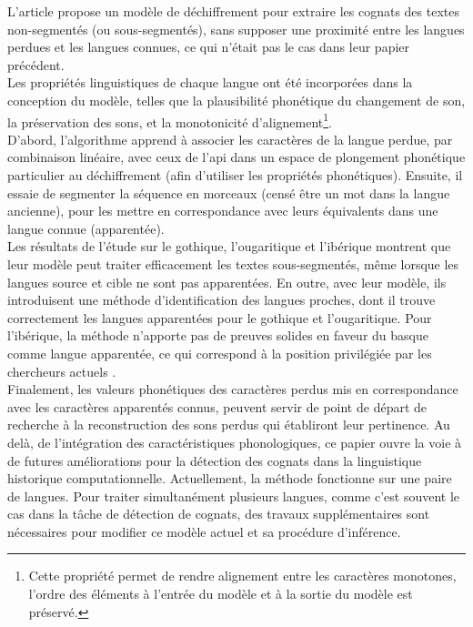 \documentclass[12pt, twoside]{report}
\begin{document}
L'article propose un modèle de déchiffrement pour extraire les \glspl{cognat} des textes non-segmentés (ou sous-segmentés), sans supposer une proximité entre les langues perdues et les langues connues, ce qui n'était pas le cas dans leur papier précédent\autocite{ugaritic-and-linear-B}.\\
\indent Les propriétés linguistiques de chaque langue ont été incorporées dans la conception du modèle, telles que la plausibilité phonétique du changement de son, la préservation des sons, et la monotonicité d'alignement\footnote{Cette propriété permet de rendre alignement entre les caractères monotones, l'ordre des éléments à l'entrée du modèle et à la sortie du modèle est préservé.}.\\
\indent D'abord, l'algorithme apprend à associer les caractères de la langue perdue, par combinaison linéaire, avec ceux de l'\gls{api} dans un espace de plongement phonétique particulier au déchiffrement (afin d'utiliser les propriétés phonétiques). Ensuite, il essaie de segmenter la séquence en morceaux (censé être un mot dans la langue ancienne), pour les mettre en correspondance avec leurs équivalents dans une langue connue (apparentée).\\
\indent Les résultats de l'étude sur le gothique, l'ougaritique et l'ibérique montrent que leur modèle peut traiter efficacement les textes sous-segmentés, même lorsque les langues source et cible ne sont pas apparentées. En outre, avec leur modèle, ils introduisent une méthode d'identification des langues proches, dont il trouve correctement les langues apparentées pour le gothique et l'ougaritique. Pour l'ibérique, la méthode n'apporte pas de preuves solides en faveur du basque comme langue apparentée, ce qui correspond à la position privilégiée par les chercheurs actuels \autocite{deepmind2022}.\\
\indent Finalement, les valeurs phonétiques des caractères perdus mis en correspondance avec les caractères apparentés connus, peuvent servir de point de départ de recherche à la reconstruction des sons perdus qui établiront leur pertinence. Au delà, de l'intégration des caractéristiques phonologiques, ce papier ouvre la voie à de futures améliorations pour la détection des \glspl{cognat} dans la linguistique historique computationnelle. Actuellement, la méthode fonctionne sur une paire de langues. Pour traiter simultanément plusieurs langues, comme c'est souvent le cas dans la tâche de détection de \glspl{cognat}, des travaux supplémentaires sont nécessaires pour modifier ce modèle actuel et sa procédure d'inférence.\\
\end{document}
